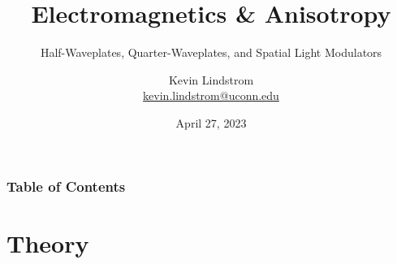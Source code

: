 \documentclass[aspectratio=169,t,xcolor=table]{beamer}
\begin{document}
\title{Electromagnetics \& Anisotropy}
\subtitle{Half-Waveplates, Quarter-Waveplates, and Spatial Light Modulators}

\author{Kevin Lindstrom\\
\textrm{\href{mailto:kevin.lindstrom@uconn.edu}{kevin.lindstrom@uconn.edu}}}
\date{April 27, 2023}


\frame[noframenumbering]{\titlepage}



\begin{frame}
    \frametitle{Table of Contents}
    \tableofcontents
\end{frame}




\section{Theory}
\end{document}
